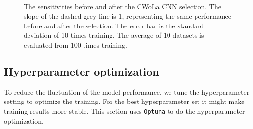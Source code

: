 \documentclass[12pt]{article}
\begin{document}
		\begin{figure}[htpb]
			\centering
			 \\
			\caption{The sensitivities before and after the CWoLa CNN selection. The slope of the dashed grey line is $1$, representing the same performance before and after the selection. The error bar is the standard deviation of 10 times training. The average of 10 datasets is evaluated from 100 times training.}
			\label{fig:sensitivity_improvement_jet_aug_3_random_res_25}
		\end{figure}
	\subsection{Hyperparameter optimization}%
	\label{sub:hyperparameter_optimization}
		To reduce the fluctuation of the model performance, we tune the hyperparameter setting to optimize the training. For the best hyperparameter set it might make training results more stable. This section uses \verb|Optuna| to do the hyperparameter optimization.
\end{document}
